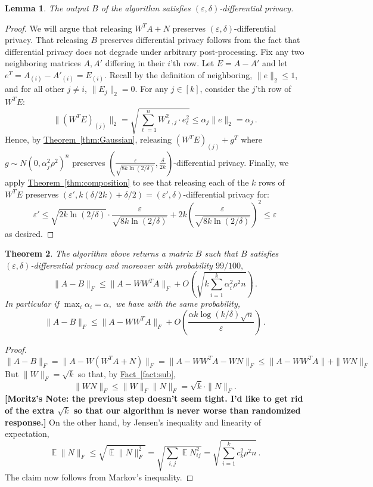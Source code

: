\documentclass[letterpaper,11pt]{article}
\newcommand{\authnote}[2]{{ \footnotesize \bf{\color{DarkRed}[#1's Note:
{\color{DarkBlue}#2}]}}}
\newcommand{\authnote}[2]{}
\newcommand{\Mnote}[1]{{\authnote{Moritz} {#1}}}
\newtheorem{theorem}{Theorem}[section]
\newtheorem{lemma}[theorem]{Lemma}
\theoremstyle{definition}
\newcommand{\factref}[1]{\hyperref[fact:#1]{Fact~\ref{fact:#1}}}
\newcommand{\theoremlabel}[1]{\label{thm:#1}}
\newcommand{\theoremref}[1]{\hyperref[thm:#1]{Theorem~\ref{thm:#1}}}
\newcommand{\Esymb}{\mathbb{E}}
\DeclareMathOperator*{\E}{\Esymb}
\newcommand{\mper}{\,.}
\renewcommand{\leq}{\leqslant}
\renewcommand{\le}{\leqslant}
\renewcommand{\epsilon}{\varepsilon}
\begin{document}
\begin{lemma}
The output $B$ of the algorithm satisfies $(\epsilon,\delta)$-differential
privacy.
\end{lemma}

\begin{proof}
We will argue that releasing $W^TA + N$ preserves
$(\epsilon,\delta)$-differential privacy. That releasing $B$ preserves
differential privacy follows from the fact that differential privacy does not
degrade under arbitrary post-processing.  Fix any two neighboring matrices $A,
A'$ differing in their $i$'th row. Let $E = A - A'$ and
let $e^T = A_{(i)} - A'_{(i)} = E_{(i)}.$
Recall by the definition of neighboring, $\|e\|_2 \leq 1$, and for all
other $j \neq i$, $\|E_j\|_2 = 0$. For any $j \in [k]$, consider the $j$'th
row of $W^TE$:
\[
\|(W^TE)_{(j)}\|_2 = \sqrt{\sum_{\ell=1}^n W_{\ell, j}^2\cdot
e_\ell^2} \leq \alpha_j \|e\|_2 = \alpha_j\mper
\]
Hence, by \theoremref{Gaussian}, releasing $(W^TE)_{(j)} + g^T$ where $g\sim
N(0, \alpha_j^2\rho^2)^n$ preserves $(\frac{\epsilon}{\sqrt{8k\ln
(2/\delta)}}, \frac{\delta}{2k})$-differential privacy.  Finally, we apply
\theoremref{composition} to see that releasing each of the $k$ rows of $W^TE$
preserves $(\epsilon',k(\delta/2k) + \delta/2) =
(\epsilon',\delta)$-differential privacy for: $$\epsilon' \leq
\sqrt{2k\ln(2/\delta)}\cdot\frac{\epsilon}{\sqrt{8k\ln (2/\delta)}} +
2k\left(\frac{\epsilon}{\sqrt{8k\ln (2/\delta)}}\right)^2 \leq \epsilon$$
as desired.
\end{proof}

\begin{theorem}\theoremlabel{projection}
The algorithm above returns a matrix $B$ such that $B$ satisfies
$(\epsilon,\delta)$-differential privacy and moreover with probability
$99/100,$
\[
\|A-B\|_F\le \|A-WW^TA\|_F + O\left(\sqrt{k\sum_{i=1}^k \alpha_i^2\rho^2
n}\right)\mper
\]
In particular if $\max_i\alpha_i=\alpha,$ we have with the same probability,
\[
\|A-B\|_F\le \|A-WW^TA\|_F
+ O\left(\frac{\alpha k\log(k/\delta)\sqrt{n}}\epsilon\right)\mper
\]
\end{theorem}

\begin{proof}
\[
\|A-B\|_F
=\|A-W(W^TA+N)\|_F
=\|A-WW^TA - WN\|_F
\le\|A-WW^TA\|+\|WN\|_F
\]
But $\|W\|_F=\sqrt{k}$ so that, by \factref{sub},
\[
\|WN\|_F\le\|W\|_F\|N\|_F=\sqrt{k}\cdot \|N\|_F.
\]
\Mnote{the previous step doesn't seem tight. I'd like to get rid of the extra
$\sqrt{k}$ so that our algorithm is never worse than randomized response.}
On the other hand, by Jensen's inequality and linearity of expectation,
\[
\E\|N\|_F
\le \sqrt{\E\|N\|_F^2}
= \sqrt{\sum_{i,j} \E N_{ij}^2}
= \sqrt{\sum_{i=1}^k c_k^2\rho^2n}\mper
\]
The claim now follows from Markov's inequality.
\end{proof}
\end{document}
